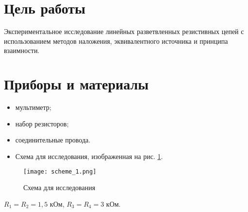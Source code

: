 \section{Цель работы}

Экспериментальное исследование линейных разветвленных
резистивных цепей с использованием методов наложения, эквивалентного
источника и принципа взаимности.

\section{Приборы и материалы}

\begin{itemize}
    \item мультиметр;
    \item набор резисторов;
    \item соединительные провода.
    \item Схема для исследования, изображенная на рис. \ref*{fig:scheme_1}.
\end{itemize}

\begin{figure}[!h]
    \centering
    \texttt{[image: scheme\_1.png]}
    \caption{Схема для исследования}
    \label{fig:scheme_1}
\end{figure}

$R_1 = R_2 = 1,5$ кОм, $R_3 = R_4 = 3$ кОм.
